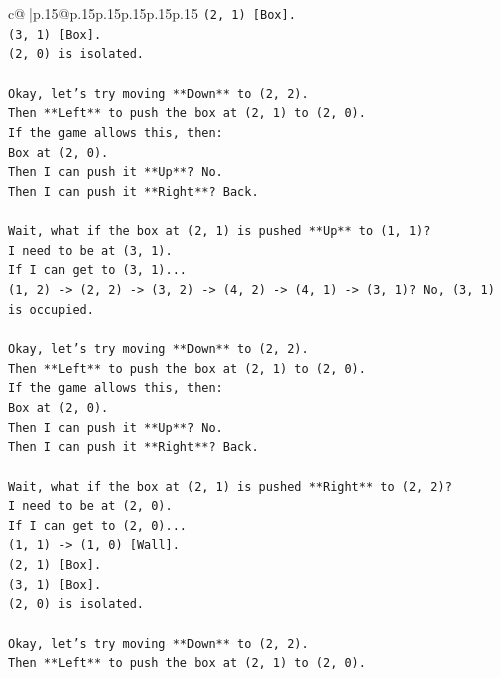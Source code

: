 \documentclass{article}
\begin{document}
{\begin{supertabular}{c@{$\;$}|p{.15\linewidth}@{}p{.15\linewidth}p{.15\linewidth}p{.15\linewidth}p{.15\linewidth}p{.15\linewidth}}
{{{\texttt{(2, 1) {[}Box{]}.} \\
\texttt{(3, 1) {[}Box{]}.} \\
\texttt{(2, 0) is isolated.} \\
\\ 
\texttt{Okay, let's try moving **Down** to (2, 2).} \\
\texttt{Then **Left** to push the box at (2, 1) to (2, 0).} \\
\texttt{If the game allows this, then:} \\
\texttt{Box at (2, 0).} \\
\texttt{Then I can push it **Up**? No.} \\
\texttt{Then I can push it **Right**? Back.} \\
\\ 
\texttt{Wait, what if the box at (2, 1) is pushed **Up** to (1, 1)?} \\
\texttt{I need to be at (3, 1).} \\
\texttt{If I can get to (3, 1)...} \\
\texttt{(1, 2) {-}> (2, 2) {-}> (3, 2) {-}> (4, 2) {-}> (4, 1) {-}> (3, 1)? No, (3, 1) is occupied.} \\
\\ 
\texttt{Okay, let's try moving **Down** to (2, 2).} \\
\texttt{Then **Left** to push the box at (2, 1) to (2, 0).} \\
\texttt{If the game allows this, then:} \\
\texttt{Box at (2, 0).} \\
\texttt{Then I can push it **Up**? No.} \\
\texttt{Then I can push it **Right**? Back.} \\
\\ 
\texttt{Wait, what if the box at (2, 1) is pushed **Right** to (2, 2)?} \\
\texttt{I need to be at (2, 0).} \\
\texttt{If I can get to (2, 0)...} \\
\texttt{(1, 1) {-}> (1, 0) {[}Wall{]}.} \\
\texttt{(2, 1) {[}Box{]}.} \\
\texttt{(3, 1) {[}Box{]}.} \\
\texttt{(2, 0) is isolated.} \\
\\ 
\texttt{Okay, let's try moving **Down** to (2, 2).} \\
\texttt{Then **Left** to push the box at (2, 1) to (2, 0).} \\
}}}
\end{supertabular}}
\end{document}
